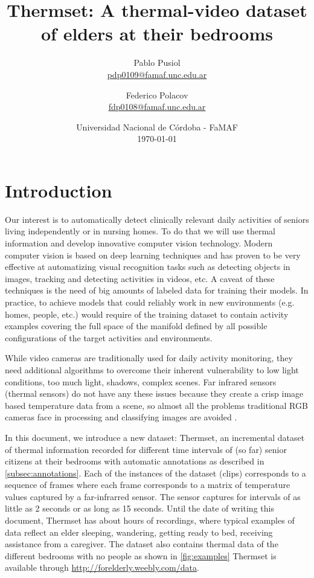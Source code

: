 \documentclass[oneside, twocolumn]{article}
\title{\LARGE Thermset: A thermal-video dataset of elders at their bedrooms} %
\author{Pablo Pusiol\\ \href{mailto:pdp0109@famaf.unc.edu.ar \qquad Pablo Pusiol }{pdp0109@famaf.unc.edu.ar} \and Federico Polacov \\\href{mailto:fdp0108@famaf.unc.edu.ar}{fdp0108@famaf.unc.edu.ar}}
\date{Universidad Nacional de C\'ordoba - FaMAF \\ \today}
\begin{document}
\maketitle


\section{Introduction}
\label{sec:introduction}
Our interest is to automatically detect clinically relevant daily activities of seniors living independently
or in nursing homes. To do that we will use thermal information and develop innovative computer vision technology.
Modern computer vision is based on deep learning techniques and has proven to be very effective at automatizing
visual recognition tasks such as detecting objects in images, tracking and detecting activities in videos, etc.
A caveat of these techniques is the need of big amounts of labeled data for training their models. In practice,
to achieve  models that could reliably work in new  environments (e.g. homes, people, etc.) would require of the
training dataset to contain activity examples covering the full space of the manifold defined by all possible
configurations of the target activities and environments.

While video cameras are traditionally used for daily activity monitoring, they need additional algorithms to
overcome their inherent vulnerability to low light conditions, too much light, shadows, complex scenes. Far
infrared sensors (thermal sensors) do not have any these issues because they create a crisp image based temperature
data from a scene, so almost all the problems traditional RGB cameras face in processing and classifying images are
avoided \cite{chengl}.

In this document, we introduce a new dataset: Thermset, an incremental dataset of thermal information recorded
for different time intervals of (so far) \NumberOfPeople{} senior citizens at their bedrooms with automatic
annotations as described in \autoref{subsec:annotations}. Each of the instances of the dataset (clips) corresponds
 to a sequence of frames where each frame corresponds to a matrix of temperature values captured by a
 far-infrarred sensor. The sensor captures for intervals of as little as 2 seconds or as long as 15 seconds. Until
 the date of writing this document, Thermset has about \TotalHoursOfRecording{} hours of recordings, where typical
 examples of data reflect an elder sleeping, wandering, getting ready to bed, receiving assistance from a caregiver.
 The dataset also contains thermal data of the different bedrooms with no people as shown in \autoref{fig:examples}
 Thermset is available through \url{http://forelderly.weebly.com/data}.
\end{document}
